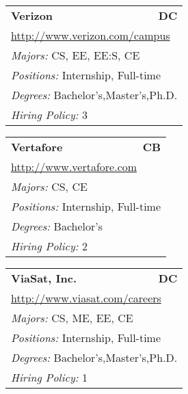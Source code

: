 \documentclass[twoside]{article}
\begin{document}
\begin{center}
\begin{multicols}{3}
\begin{FlushLeft}
\begin{minipage}{\columnwidth}
\end{minipage}
 
\begin{minipage}{\columnwidth}\begin{tabularx}{.95\columnwidth}{Xr}
                 {\Large\bf Verizon} & {\Large\bf DC}\\
    \multicolumn{2}{p{.95\columnwidth}}{\url{http://www.verizon.com/campus}}\\
    \multicolumn{2}{p{.95\columnwidth}}{\emph{Majors:} CS, EE, EE:S, CE}\\
    \multicolumn{2}{p{.95\columnwidth}}{\emph{Positions:} Internship, Full-time}\\
    \multicolumn{2}{p{.95\columnwidth}}{\emph{Degrees:} Bachelor's,Master's,Ph.D.}\\
    \multicolumn{2}{p{.95\columnwidth}}{\emph{Hiring Policy:} 3}\\
    \end{tabularx}
    
\end{minipage}
 
\begin{minipage}{\columnwidth}\begin{tabularx}{.95\columnwidth}{Xr}
                 {\Large\bf Vertafore} & {\Large\bf CB}\\
    \multicolumn{2}{p{.95\columnwidth}}{\url{http://www.vertafore.com}}\\
    \multicolumn{2}{p{.95\columnwidth}}{\emph{Majors:} CS, CE}\\
    \multicolumn{2}{p{.95\columnwidth}}{\emph{Positions:} Internship, Full-time}\\
    \multicolumn{2}{p{.95\columnwidth}}{\emph{Degrees:} Bachelor's}\\
    \multicolumn{2}{p{.95\columnwidth}}{\emph{Hiring Policy:} 2}\\
    \end{tabularx}
    
\end{minipage}
 
\begin{minipage}{\columnwidth}\begin{tabularx}{.95\columnwidth}{Xr}
                 {\Large\bf ViaSat, Inc.} & {\Large\bf DC}\\
    \multicolumn{2}{p{.95\columnwidth}}{\url{http://www.viasat.com/careers}}\\
    \multicolumn{2}{p{.95\columnwidth}}{\emph{Majors:} CS, ME, EE, CE}\\
    \multicolumn{2}{p{.95\columnwidth}}{\emph{Positions:} Internship, Full-time}\\
    \multicolumn{2}{p{.95\columnwidth}}{\emph{Degrees:} Bachelor's,Master's,Ph.D.}\\
    \multicolumn{2}{p{.95\columnwidth}}{\emph{Hiring Policy:} 1}\\
    \end{tabularx}
    

\end{minipage}
\end{FlushLeft}
\end{multicols}
\end{center}
\end{document}

